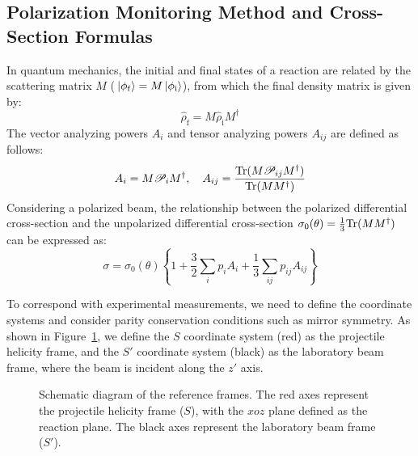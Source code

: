 \documentclass[11pt,a4paper]{article}
\begin{document}
\subsection{Polarization Monitoring Method and Cross-Section Formulas}

In quantum mechanics, the initial and final states of a reaction are related by the scattering matrix $M$ ($\ket*{\phi_{\mathrm{f}}} = M \ket*{\phi_{\mathrm{i}}}$), from which the final density matrix is given by:
\begin{equation}
\hat{\rho}_{\mathrm{f}} = M\hat{\rho}_{\mathrm{i}} M^\dagger
\end{equation}
The vector analyzing powers $A_i$ and tensor analyzing powers $A_{ij}$ are defined as follows:
\begin{equation}
    A_i = M \mathscr{P}_i M^\dagger , \quad A_{ij} = \frac{{\rm Tr} (M \mathscr{P}_{ij} M^\dagger)}{{\rm Tr}(MM^\dagger)}
\end{equation}
Considering a polarized beam, the relationship between the polarized differential cross-section and the unpolarized differential cross-section $\sigma_0(\theta) = \frac{1}{3} {\rm Tr}(M M^\dagger)$ can be expressed as:
\begin{equation}
\label{eq:primary_pol_crosssection}
    \sigma = \sigma_0(\theta) \left\{ 1 + \frac{3}{2} \sum_i p_i A_i  + \frac{1}{3} \sum_{ij} p_{ij} A_{ij}\right\} 
\end{equation}

To correspond with experimental measurements, we need to define the coordinate systems and consider parity conservation conditions such as mirror symmetry. As shown in Figure~\ref{fig:frame}, we define the $S$ coordinate system (red) as the projectile helicity frame, and the $S'$ coordinate system (black) as the laboratory beam frame, where the beam is incident along the $z'$ axis.

\begin{figure}[htbp]
\begin{center}
\end{center}
\caption{Schematic diagram of the reference frames. The red axes represent the projectile helicity frame ($S$), with the $xoz$ plane defined as the reaction plane. The black axes represent the laboratory beam frame ($S'$).}
\label{fig:frame}
\end{figure}
\end{document}
